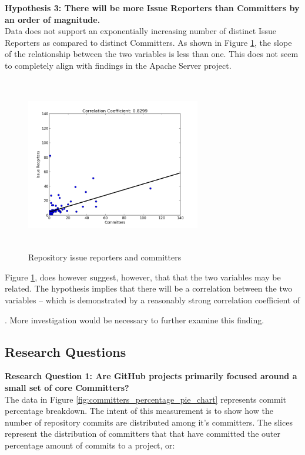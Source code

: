 \documentclass{proc}
\begin{document}
{{{{{{\noindent \textbf{Hypothesis 3: There will be more Issue Reporters than Committers by an order of magnitude.}\\
Data does not support an exponentially increasing number of distinct Issue Reporters as compared to distinct Committers. 
As shown in Figure \ref{fig:issue_reporters_committers_scatterplot}, the slope of the relationship between the two variables is less than one. This does not seem to completely align with findings in the Apache Server project\cite{mockus2000case}. 

\begin{figure}
\includegraphics[height=3in,width=3in]{images/issue_reporters_committers_scatterplot.png}
\caption{Repository issue reporters and committers}
\label{fig:issue_reporters_committers_scatterplot}
\end{figure}

Figure \ref{fig:issue_reporters_committers_scatterplot}, does however suggest, however, that that the two variables may be related. The hypothesis implies that there will be a correlation between the two variables -- which is demonstrated by a reasonably strong correlation coefficient of }\unskip. More investigation would be necessary to further examine this finding.\\

\subsection{Research Questions}
\noindent \textbf{Research Question 1: Are GitHub projects primarily focused around a small set of core Committers?}\\
The data in Figure \ref{fig:committers_percentage_pie_chart} represents commit percentage breakdown. The intent of this measurement is to show how the number of repository commits are distributed among it's committers. The slices represent the distribution of committers that that have committed the outer percentage amount of commits to a project, or:

}}}}}
\end{document}
